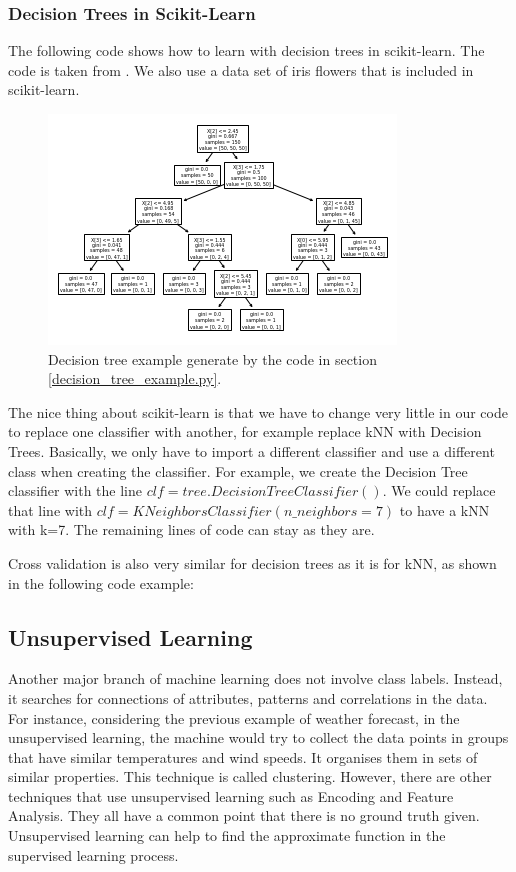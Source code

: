 \documentclass[10pt,a4paper]{article}
\newcommand{\te}{\texttt}
\begin{document}
\subsubsection{Decision Trees in Scikit-Learn}
The following code shows how to learn with decision trees in scikit-learn. The code is taken from \cite{DecisionTreesScikitLearn}. We also use a data set of iris flowers that is included in scikit-learn.
\label{decision_tree_example.py}
\begin{figure}[htbp]
    \centering
    \includegraphics[scale=0.9]{decision_tree_iris.png}
    \caption{Decision tree example generate by the code in section \ref{decision_tree_example.py}.}
    \label{fig:decision}
\end{figure}
The nice thing about scikit-learn is that we have to change very little in our code to replace one classifier with another, for example replace kNN with Decision Trees. Basically, we only have to import a different classifier and use a different class when creating the classifier. For example, we create the Decision Tree classifier with the line \te{$clf = tree.DecisionTreeClassifier()$}. We could replace that line with \texttt{$clf = KNeighborsClassifier\left(n\_neighbors=7\right)$} to have a kNN with k=7. The remaining lines of code can stay as they are.

Cross validation is also very similar for decision trees as it is for kNN, as shown in the following code example:
\label{cross_v_decisiontree.py}
\subsection{Unsupervised Learning}
Another major branch of machine learning does not involve class labels. Instead, it searches for connections of attributes, patterns and correlations in the data. For instance, considering the previous example of weather forecast, in the unsupervised learning, the machine would try to collect the data points in groups that have similar temperatures and wind speeds. It organises them in sets of similar properties. This technique is called clustering. However, there are other techniques that use unsupervised learning such as Encoding and Feature Analysis.
They all have a common point that there is no ground truth given. Unsupervised learning can help to find the approximate function in the supervised learning process.
\end{document}
